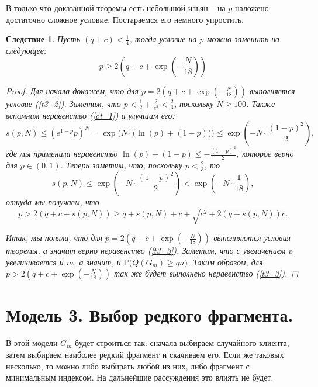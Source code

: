 \documentclass{matmex-diploma-custom}
\newcommand{\PRob}{\mathbb P}
\newcommand{\leqs}{\leqslant}
\newcommand{\geqs}{\geqslant}
\newtheorem{cons}{Следствие}
\theoremstyle{named}
\begin{document}
В только что доказанной теоремы есть небольшой изъян -- на $p$ наложено достаточно сложное условие. 
Постараемся его немного упростить.
\begin{cons}
Пусть $(q+c) < \frac{1}{4}$, тогда условие на $p$ можно заменить на следующее:
\begin{equation}
p \geqs 2\left(q + c + \exp\left(-\frac{N}{18}\right) \right)
\end{equation}

\begin{proof}
Для начала докажем, что для $p = 2\left(q + c + \exp\left(-\frac{N}{18}\right) \right)$ выполняется условие (\ref{t3_2}).
Заметим, что $p < \frac{1}{2} + \frac{2}{e^5} < \frac{2}{3}$, поскольку $N \geqs 100$.
Также вспомним неравенство (\ref{ot_1}) и улучшим его:
\begin{equation}
s(p, N) \leqs (e^{1-p} p)^N 
	=
\exp\Big(N\cdot \big( \ln(p) + (1-p) \big)\Big)
	\leqs
\exp\left( - N \cdot \frac{(1-p)^2}{2}\right),
\end{equation}
где мы применили неравенство $\ln(p) + (1-p) \leqs - \frac{(1-p)^2}{2}$, которое верно для $p\in(0,1)$.
Теперь заметим, что, поскольку $p < \frac{2}{3}$, то 
\begin{equation}
s(p, N) \leqs \exp\left( - N \cdot \frac{(1-p)^2}{2}\right) < \exp\left( - N\cdot \frac{1}{18}\right),
\end{equation}
откуда мы получаем, что 
\begin{equation}
p > 2(q+c+s(p,N)) \geqs q + s(p, N) + c + \sqrt{c^2+2(q+s(p, N))c}.
\end{equation}

Итак, мы поняли, что для $p = 2\left(q + c + \exp\left(-\frac{N}{18}\right) \right)$ выполняются условия теоремы, 
а значит верно неравенство (\ref{t3_3}). 
Заметим, что с увеличением $p$ увеличивается и $m$, а значит, и $\PRob\big(Q(G_m) \geqs qn\big)$.
Таким образом, для $p > 2\left(q + c + \exp\left(-\frac{N}{18}\right) \right)$ так же будет выполнено неравенство (\ref{t3_3}).
\end{proof}
\end{cons}


\newpage
\section*{Модель 3. Выбор редкого фрагмента.}

В этой модели $G_m$ будет строиться так: сначала выбираем случайного клиента, затем выбираем наиболее редкий фрагмент и скачиваем его.
Если же таковых несколько, то можно либо выбирать любой из них, либо фрагмент с минимальным индексом. 
На дальнейшие рассуждения это влиять не будет.
\end{document}
